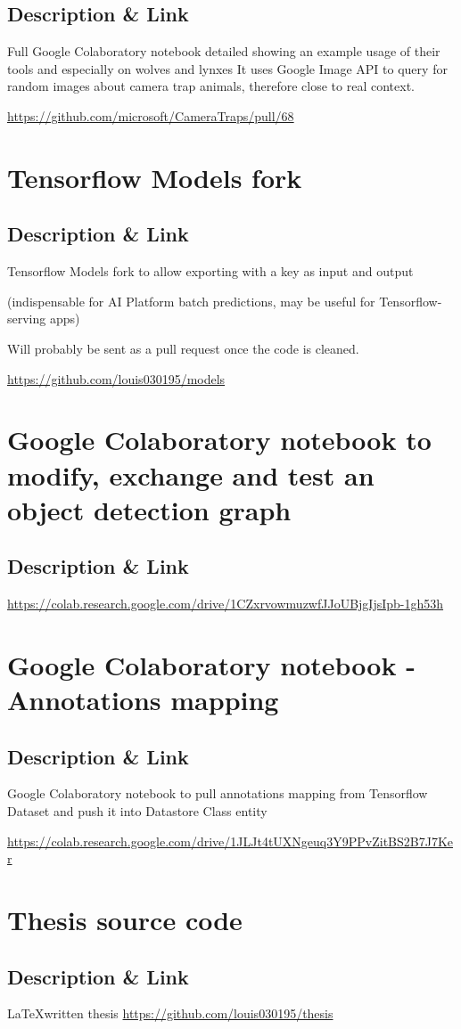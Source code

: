 \documentclass[a4paper,11pt]{report}
\begin{document}
\subsection{Description \& Link}
Full Google Colaboratory notebook detailed showing an example usage of their tools and especially on wolves and lynxes It uses Google Image API to query for random images about camera trap animals, therefore close to real context.

\url{https://github.com/microsoft/CameraTraps/pull/68}

\pagebreak\section{Tensorflow Models fork}
\subsection{Description \& Link}
Tensorflow Models fork to allow exporting with a key as input and output

(indispensable for AI Platform batch predictions, may be useful for Tensorflow-serving apps)

Will probably be sent as a pull request once the code is cleaned.

\url{https://github.com/louis030195/models}

\pagebreak\section{Google Colaboratory notebook to modify, exchange and test an object detection graph}
\subsection{Description \& Link}

\url{https://colab.research.google.com/drive/1CZxrvowmuzwfJJoUBjgIjsIpb-1gh53h}

\pagebreak\section{Google Colaboratory notebook - Annotations mapping}
\subsection{Description \& Link}
Google Colaboratory notebook to pull annotations mapping from Tensorflow Dataset and push it into Datastore Class entity

\url{https://colab.research.google.com/drive/1JLJt4tUXNgeuq3Y9PPvZitBS2B7J7Ker}

\pagebreak\section{Thesis source code}
\subsection{Description \& Link}
\LaTeX written thesis
\url{https://github.com/louis030195/thesis}
\end{document}

